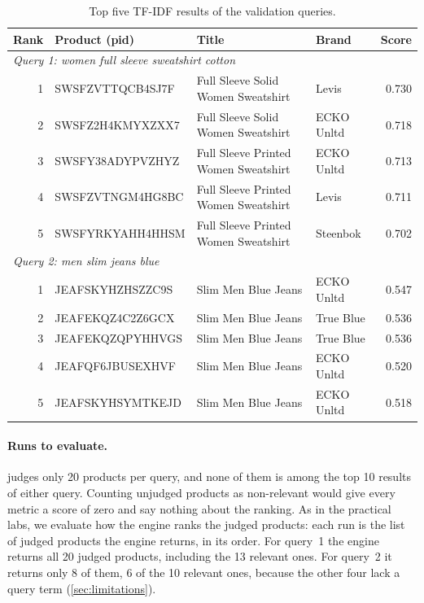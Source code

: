 \documentclass[11pt,a4paper]{article}
\begin{document}
\begin{table}[htbp]
  \centering
  \small
  \caption{Top five TF-IDF results of the validation queries.}
  \label{tab:top}
  \begin{tabular}{rlllr}
    \toprule
    Rank & Product (pid) & Title & Brand & Score \\
    \midrule
    \multicolumn{5}{l}{\emph{Query 1: women full sleeve sweatshirt cotton}} \\
    1 & SWSFZVTTQCB4SJ7F & Full Sleeve Solid Women Sweatshirt & Levis & 0.730 \\
    2 & SWSFZ2H4KMYXZXX7 & Full Sleeve Solid Women Sweatshirt & ECKO Unltd & 0.718 \\
    3 & SWSFY38ADYPVZHYZ & Full Sleeve Printed Women Sweatshirt & ECKO Unltd & 0.713 \\
    4 & SWSFZVTNGM4HG8BC & Full Sleeve Printed Women Sweatshirt & Levis & 0.711 \\
    5 & SWSFYRKYAHH4HHSM & Full Sleeve Printed Women Sweatshirt & Steenbok & 0.702 \\
    \midrule
    \multicolumn{5}{l}{\emph{Query 2: men slim jeans blue}} \\
    1 & JEAFSKYHZHSZZC9S & Slim Men Blue Jeans & ECKO Unltd & 0.547 \\
    2 & JEAFEKQZ4C2Z6GCX & Slim Men Blue Jeans & True Blue & 0.536 \\
    3 & JEAFEKQZQPYHHVGS & Slim Men Blue Jeans & True Blue & 0.536 \\
    4 & JEAFQF6JBUSEXHVF & Slim Men Blue Jeans & ECKO Unltd & 0.520 \\
    5 & JEAFSKYHSYMTKEJD & Slim Men Blue Jeans & ECKO Unltd & 0.518 \\
    \bottomrule
  \end{tabular}
\end{table}

\paragraph{Runs to evaluate.}  judges only 20
products per query, and none of them is among the top 10 results of either
query. Counting unjudged products as non-relevant would give every metric a
score of zero and say nothing about the ranking. As in the practical labs, we
evaluate how the engine ranks the judged products: each run is the list of
judged products the engine returns, in its order. For query~1 the engine
returns all 20 judged products, including the 13 relevant ones. For query~2 it
returns only 8 of them, 6 of the 10 relevant ones, because the other four lack
a query term (\cref{sec:limitations}).
\end{document}
